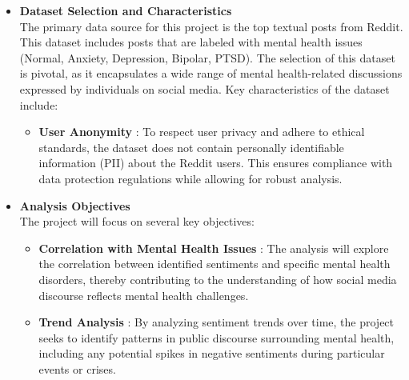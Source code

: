 \begin{itemize}
    \item \textbf{Dataset Selection and Characteristics} \\
    \noindent
    The primary data source for this project is the top textual posts from Reddit. This dataset includes posts that are labeled with mental health issues (Normal, Anxiety, Depression, Bipolar, PTSD). The selection of this dataset is pivotal, as it encapsulates a wide range of mental health-related discussions expressed by individuals on social media. Key characteristics of the dataset include:
    \begin{itemize}
        \item \textbf{User Anonymity} :
        \noindent
        To respect user privacy and adhere to ethical standards, the dataset does not contain personally identifiable information (PII) about the Reddit users. This ensures compliance with data protection regulations while allowing for robust analysis.
    \end{itemize}

    \item \textbf{Analysis Objectives} \\
    \noindent
    The project will focus on several key objectives:
    \begin{itemize}
        \item \textbf{Correlation with Mental Health Issues} :
        \noindent
        The analysis will explore the correlation between identified sentiments and specific mental health disorders, thereby contributing to the understanding of how social media discourse reflects mental health challenges.
        \item \textbf{Trend Analysis} :
        \noindent
        By analyzing sentiment trends over time, the project seeks to identify patterns in public discourse surrounding mental health, including any potential spikes in negative sentiments during particular events or crises.
    \end{itemize}


\end{itemize}
